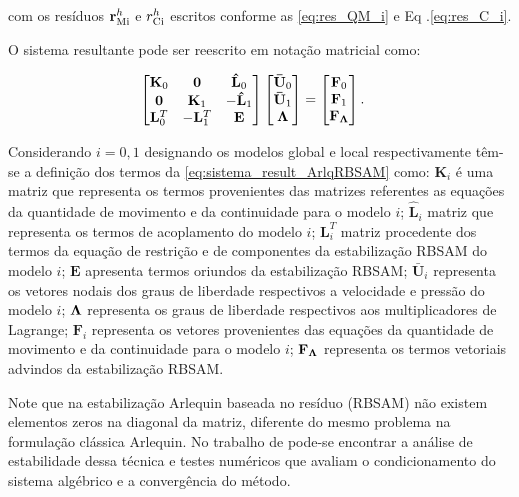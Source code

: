\noindent com os resíduos $\mathbf{r}_{\mathrm{Mi}}^{h}$ e $r_{\mathrm{Ci}}^{h}$ escritos conforme as \autoref{eq:res_QM_i} e Eq .\ref{eq:res_C_i}.

O sistema resultante pode ser reescrito em notação matricial como:

\begin{align}
	\begin{bmatrix}
		\mathbf{K}_{0} & \mathbf{0} & \mathbf{\hat{L}}_{0} \\
		\mathbf{0} & \mathbf{K}_{1} & - \mathbf{\hat{L}}_{1} \\
		\mathbf{L}_{0}^{T} & -\mathbf{L}_{1}^{T} & \mathbf{E}
	\end{bmatrix}
	\begin{bmatrix}
		\mathbf{\bar{U}}_{0} \\
		\mathbf{\bar{U}}_{1} \\
		\boldsymbol{\Lambda}
	\end{bmatrix}
	&=
	\begin{bmatrix}
		\mathbf{F}_0 \\
		\mathbf{F}_1 \\
		\mathbf{F}_{\boldsymbol{\Lambda}}
	\end{bmatrix}.
	\label{eq:sistema_result_ArlqRBSAM}
\end{align}	

Considerando $i=0,1$ designando os modelos global e local respectivamente têm-se a definição dos termos da \autoref{eq:sistema_result_ArlqRBSAM} como: $\mathbf{K}_{i}$ é uma matriz que representa os termos provenientes das matrizes referentes as equações da quantidade de movimento e da continuidade para o modelo $i$; $\mathbf{\hat{L}}_{i}$ matriz que representa os termos de acoplamento do modelo $i$; $\mathbf{L}_{i}^{T}$ matriz procedente dos termos da equação de restrição e de componentes da estabilização RBSAM do modelo $i$; $\mathbf{E}$ apresenta termos oriundos da estabilização RBSAM; $\mathbf{\bar{U}}_{i}$ representa os vetores nodais dos graus de liberdade respectivos a velocidade e pressão do modelo $i$; $\boldsymbol{\Lambda}$ representa os graus de liberdade respectivos aos multiplicadores de Lagrange; $\mathbf{F}_i$ representa os vetores provenientes das equações da quantidade de movimento e da continuidade para o modelo $i$; $\mathbf{F}_{\boldsymbol{\Lambda}}$ representa os termos vetoriais advindos da estabilização RBSAM. 

Note que na estabilização Arlequin baseada no resíduo (RBSAM) não existem elementos zeros na diagonal da matriz, diferente do mesmo problema na formulação clássica Arlequin. No trabalho de  pode-se encontrar a análise de estabilidade dessa técnica e testes numéricos que avaliam o condicionamento do sistema algébrico e a convergência do método.

